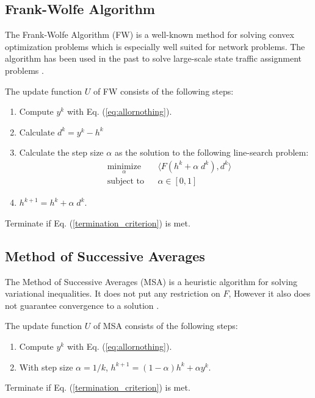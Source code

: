 \subsection{Frank-Wolfe Algorithm}

The Frank-Wolfe Algorithm (FW) 
\cite{fukushima1984modified, gartner1977analysis} 
is a well-known method for solving convex optimization problems which is especially well suited for network problems. The algorithm has been used in the past to solve large-scale state traffic assignment problems \cite{thai2016negative}.

The update function $U$ of FW consists of the following steps:
\begin{enumerate}
\item Compute $y^k$ with Eq. (\ref{eq:allornothing}).
\item Calculate $d^k = y^k - h^k$
\item Calculate the step size $\alpha$ as the solution to the following line-search problem:
\begin{equation}
\begin{aligned}
& \underset{\alpha}{\text{minimize}}
& & \langle F(h^k + \alpha\; d^k), d^k \rangle \\
& \text{subject to}
& & \alpha \in [0,1]
\end{aligned}
\end{equation}
\item $h^{k+1} = h^k +\alpha\; d^k$.
\end{enumerate}

Terminate if Eq. (\ref{termination_criterion}) is met.

\subsection{Method of Successive Averages}
The Method of Successive Averages (MSA) is a heuristic algorithm for solving variational inequalities. It does not put any restriction on $F$, However it also does not guarantee convergence to a solution  \cite{nie2010solving}.

The update function $U$ of MSA consists of the following steps:
\begin{enumerate}
\item Compute $y^k$ with Eq. (\ref{eq:allornothing}).
\item With step size $\alpha = 1/k$,  $h^{k+1} = (1-\alpha)h^k + \alpha y^k$. 
\end{enumerate}

Terminate if Eq. (\ref{termination_criterion}) is met.

